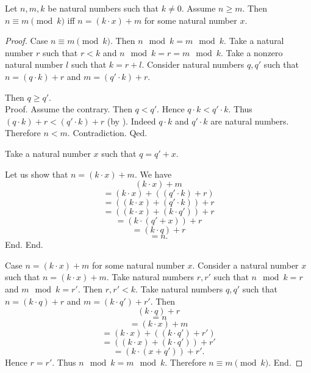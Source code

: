 \documentclass[10pt]{article}
\begin{document}
  \begin{forthel}
    \begin{proposition}
      Let $n, m, k$ be natural numbers such that $k \neq 0$.
      Assume $n \geq m$.
      Then $n \equiv m \pmod{k}$ iff $n = (k \cdot x) + m$ for some natural number $x$.
    \end{proposition}
    \begin{proof}
      Case $n \equiv m \pmod{k}$.
        Then $n \mod k = m \mod k$.
        Take a natural number $r$ such that $r < k$ and $n \mod k = r = m \mod k$.
        Take a nonzero natural number $l$ such that $k = r + l$.
        Consider natural numbers $q,q'$ such that $n = (q \cdot k) + r$ and $m = (q' \cdot k) + r$.

        Then $q \geq q'$. \\
        Proof.
          Assume the contrary.
          Then $q < q'$.
          Hence $q \cdot k < q' \cdot k$.
          Thus $(q \cdot k) + r < (q' \cdot k) + r$ (by ).
          Indeed $q \cdot k$ and $q' \cdot k$ are natural numbers.
          Therefore $n < m$.
          Contradiction.
        Qed.

        Take a natural number $x$ such that $q = q' + x$.

        Let us show that $n = (k \cdot x) + m$.
          We have
          \[  (k \cdot x) + m                       \]
          \[    = (k \cdot x) + ((q' \cdot k) + r)  \]
          \[    = ((k \cdot x) + (q' \cdot k)) + r  \]
          \[    = ((k \cdot x) + (k \cdot q')) + r  \]
          \[    = (k \cdot (q' + x)) + r            \]
          \[    = (k \cdot q) + r                   \]
          \[    = n.                                \]
        End.
      End.

      Case $n = (k \cdot x) + m$ for some natural number $x$.
        Consider a natural number $x$ such that $n = (k \cdot x) + m$.
        Take natural numbers $r, r'$ such that $n \mod k = r$ and $m \mod k = r'$.
        Then $r, r' < k$.
        Take natural numbers $q, q'$ such that $n = (k \cdot q) + r$ and $m = (k \cdot q') + r'$.
        Then
        \[  (k \cdot q) + r                         \]
        \[    = n                                   \]
        \[    = (k \cdot x) + m                     \]
        \[    = (k \cdot x) + ((k \cdot q') + r')   \]
        \[    = ((k \cdot x) + (k \cdot q')) + r'   \]
        \[    = (k \cdot (x + q')) + r'.            \]
        Hence $r = r'$.
        Thus $n \mod k = m \mod k$.
        Therefore $n \equiv m \pmod{k}$.
      End.
    \end{proof}
  \end{forthel}
\end{document}
